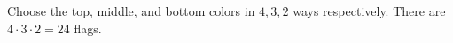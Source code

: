 Choose the top, middle, and bottom colors in $4,3,2$ ways respectively. There are $4\cdot3\cdot2=\boxed{24}$ flags.
